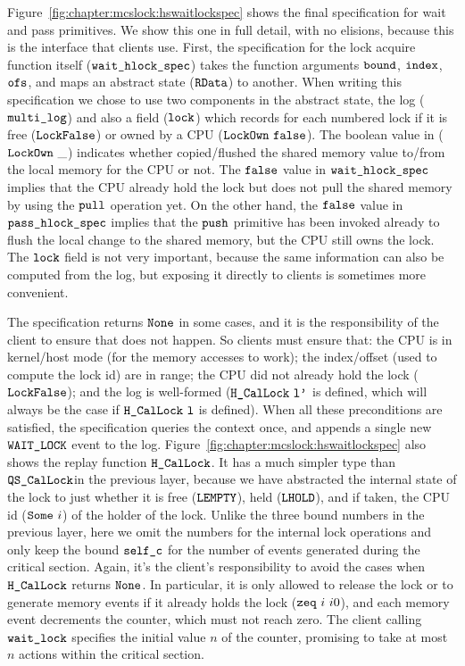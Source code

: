 Figure~\ref{fig:chapter:mcslock:hswaitlockspec} shows the final specification for 
wait and pass primitives. We show this one in full detail, with no elisions,
because this is the interface that clients use. First, the
specification for the lock acquire function itself
(${\mathrm{\texttt{wait\_hlock\_spec}}}$) takes the function arguments
${\mathrm{\texttt{bound}}}$, ${\mathrm{\texttt{index}}}$, ${\mathrm{\texttt{ofs}}}$, and maps an
abstract state (${\mathrm{\texttt{RData}}}$) to another. When writing this
specification we chose to use two components in the abstract state, the
log (${\mathrm{\texttt{multi\_log}}}$) and also a field (${\mathrm{\texttt{lock}}}$) which
records for each numbered lock if it is free (${\mathrm{\texttt{LockFalse}}}$)
or owned by a CPU (${\mathrm{\texttt{LockOwn}}} \ {{\mathrm{\texttt{false}}}}$). 
The boolean value in (${\mathrm{\texttt{LockOwn}}}\ \_$) indicates whether copied/flushed the shared memory value to/from the local memory for the CPU or not.
The ${{\mathrm{\texttt{false}}}}$ value in ${\mathrm{\texttt{wait\_hlock\_spec}}}$ implies that the CPU already hold the lock but does not pull the shared memory by using the ${\mathrm{\texttt{pull}}}$ operation yet. 
On the other hand, the  ${{\mathrm{\texttt{false}}}}$ value   in ${\mathrm{\texttt{pass\_hlock\_spec}}}$ implies that the ${\mathrm{\texttt{push}}}$ primitive has been invoked already 
to flush the local change to the shared memory, but the CPU still owns the lock.
The ${\mathrm{\texttt{lock}}}$ field is
not very important, because the same information can also be computed
from the log, but exposing it directly to clients is sometimes more
convenient.

The specification returns ${\mathrm{\texttt{None}}}$ in some
cases, and it is the
responsibility of the client to ensure  that does not
happen. So clients must ensure that: the CPU is in kernel/host
mode (for the memory accesses to work); the index/offset (used to
compute the lock id) are in range; the CPU did not already hold the
lock (${\mathrm{\texttt{LockFalse}}}$); and the log is well-formed
($\HCalLock\ \codeinmath{l'}$ is defined, which will always be the case if
${\mathrm{\texttt{H\_CalLock}}}\ {\mathrm{\texttt{l}}}$ is defined).  When all these preconditions are
satisfied, the specification queries the context once, and appends a
single new ${\mathrm{\texttt{WAIT\_LOCK}}}$ event to the log.
Figure~\ref{fig:chapter:mcslock:hswaitlockspec} also shows the replay function
${\mathrm{\texttt{H\_CalLock}}}$.
It has a much simpler type than ${\mathrm{\texttt{QS\_CalLock}}}$in the
previous layer, because we have abstracted the internal state of the lock
to just whether it is free (${\mathrm{\texttt{LEMPTY}}}$),
held (${\mathrm{\texttt{LHOLD}}}$), and if taken, the CPU id (${\mathrm{\texttt{Some}}}\ i$)
of the holder of the lock. Unlike the three bound numbers in the
previous layer, here we omit the numbers for the internal lock
operations and only keep the bound ${\mathrm{\texttt{self\_c}}}$ for the number
of events generated during the critical section. Again, it's the
client's responsibility to avoid the cases when ${\mathrm{\texttt{H\_CalLock}}}$
returns ${\mathrm{\texttt{None}}}$. In particular, it is only allowed to release
the lock or to generate memory events if it already holds the lock
(${\mathrm{\texttt{zeq}}} \ {i} \ {i0}$), and each memory event decrements the counter,
which must not reach zero. The client calling ${\mathrm{\texttt{wait\_lock}}}$
specifies the initial value $n$ of the counter, promising to take at
most $n$ actions within the critical section.


